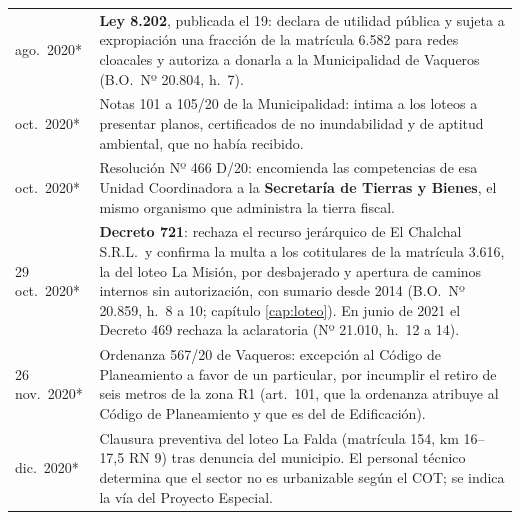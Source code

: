 \begin{longtable}{@{}p{2.7cm}p{10.3cm}@{}}
ago.\ 2020* & \textbf{Ley 8.202}, publicada el 19: declara de utilidad pública y sujeta a expropiación una fracción de la matrícula 6.582 para redes cloacales y autoriza a donarla a la Municipalidad de Vaqueros (B.O.\ Nº 20.804, h.\ 7). \\
oct.\ 2020* & Notas 101 a 105/20 de la Municipalidad: intima a los loteos a presentar planos, certificados de no inundabilidad y de aptitud ambiental, que no había recibido. \\
oct.\ 2020* & Resolución Nº 466 D/20: encomienda las competencias de esa Unidad Coordinadora a la \textbf{Secretaría de Tierras y Bienes}, el mismo organismo que administra la tierra fiscal. \\
29 oct.\ 2020* & \textbf{Decreto 721}: rechaza el recurso jerárquico de El Chalchal S.R.L.\ y confirma la multa a los cotitulares de la matrícula 3.616, la del loteo La Misión, por desbajerado y apertura de caminos internos sin autorización, con sumario desde 2014 (B.O.\ Nº 20.859, h.\ 8 a 10; capítulo \ref{cap:loteo}). En junio de 2021 el Decreto 469 rechaza la aclaratoria (Nº 21.010, h.\ 12 a 14). \\
26 nov.\ 2020* & Ordenanza 567/20 de Vaqueros: excepción al Código de Planeamiento a favor de un particular, por incumplir el retiro de seis metros de la zona R1 (art.\ 101, que la ordenanza atribuye al Código de Planeamiento y que es del de Edificación). \\
dic.\ 2020* & Clausura preventiva del loteo La Falda (matrícula 154, km 16--17,5 RN 9) tras denuncia del municipio. El personal técnico determina que el sector no es urbanizable según el COT; se indica la vía del Proyecto Especial. \\

\end{longtable}
